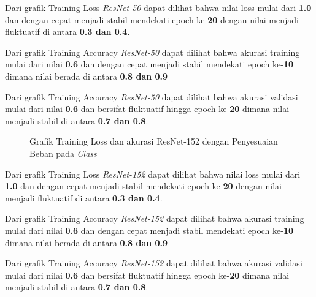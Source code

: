 Dari grafik Training Loss \emph{ResNet-50} dapat dilihat bahwa nilai loss mulai dari \textbf{1.0} dan dengan cepat menjadi stabil mendekati epoch ke-\textbf{20} dengan nilai menjadi fluktuatif di antara \textbf{0.3 dan 0.4}.

Dari grafik Training Accuracy \emph{ResNet-50} dapat dilihat bahwa akurasi training mulai dari nilai \textbf{0.6} dan dengan cepat menjadi stabil mendekati epoch ke-\textbf{10} dimana nilai berada di antara \textbf{0.8 dan 0.9} 

Dari grafik Training Accuracy \emph{ResNet-50} dapat dilihat bahwa akurasi validasi mulai dari nilai \textbf{0.6} dan bersifat fluktuatif hingga epoch ke-\textbf{20} dimana nilai menjadi stabil di antara \textbf{0.7 dan 0.8}.
\pagebreak

\begin{figure}
	\centering
	\caption{Grafik Training Loss dan akurasi ResNet-152 dengan Penyesuaian Beban pada \emph{Class}}
	\label{fig:graphTrainingWeightedPt3}
\end{figure}
Dari grafik Training Loss \emph{ResNet-152} dapat dilihat bahwa nilai loss mulai dari \textbf{1.0} dan dengan cepat menjadi stabil mendekati epoch ke-\textbf{20} dengan nilai menjadi fluktuatif di antara \textbf{0.3 dan 0.4}.

Dari grafik Training Accuracy \emph{ResNet-152} dapat dilihat bahwa akurasi training mulai dari nilai \textbf{0.6} dan dengan cepat menjadi stabil mendekati epoch ke-\textbf{10} dimana nilai berada di antara \textbf{0.8 dan 0.9} 

Dari grafik Training Accuracy \emph{ResNet-152} dapat dilihat bahwa akurasi validasi mulai dari nilai \textbf{0.6} dan bersifat fluktuatif hingga epoch ke-\textbf{20} dimana nilai menjadi stabil di antara \textbf{0.7 dan 0.8}.

